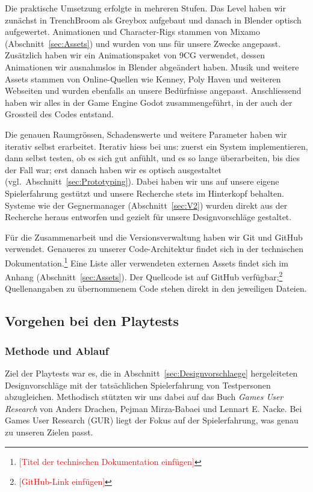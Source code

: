 \documentclass[../Main.tex]{subfiles}
\begin{document}
Die praktische Umsetzung erfolgte in mehreren Stufen. Das Level haben wir zunächst in TrenchBroom als Greybox aufgebaut und danach in Blender optisch aufgewertet. Animationen und Character-Rigs stammen von Mixamo (Abschnitt~\ref{sec:Assets}) und wurden von uns für unsere Zwecke angepasst. Zusätzlich haben wir ein Animationspaket von 9CG verwendet, dessen Animationen wir ausnahmslos in Blender abgeändert haben. Musik und weitere Assets stammen von Online-Quellen wie Kenney, Poly Haven und weiteren Webseiten und wurden ebenfalls an unsere Bedürfnisse angepasst. Anschliessend haben wir alles in der Game Engine Godot zusammengeführt, in der auch der Grossteil des Codes entstand.

Die genauen Raumgrössen, Schadenswerte und weitere Parameter haben wir iterativ selbst erarbeitet. Iterativ hiess bei uns: zuerst ein System implementieren, dann selbst testen, ob es sich gut anfühlt, und es so lange überarbeiten, bis dies der Fall war; erst danach haben wir es optisch ausgestaltet (vgl.\ Abschnitt~\ref{sec:Prototyping}). Dabei haben wir uns auf unsere eigene Spielerfahrung gestützt und unsere Recherche stets im Hinterkopf behalten. Systeme wie der Gegnermanager (Abschnitt~\ref{sec:V2}) wurden direkt aus der Recherche heraus entworfen und gezielt für unsere Designvorschläge gestaltet.

Für die Zusammenarbeit und die Versionsverwaltung haben wir Git und GitHub verwendet. Genaueres zu unserer Code-Architektur findet sich in der technischen Dokumentation.\footnote{\textcolor{red}{[Titel der technischen Dokumentation einfügen]}} Eine Liste aller verwendeten externen Assets findet sich im Anhang (Abschnitt~\ref{sec:Assets}). Der Quellcode ist auf GitHub verfügbar;\footnote{\textcolor{red}{[GitHub-Link einfügen]}} Quellenangaben zu übernommenem Code stehen direkt in den jeweiligen Dateien.

\subsection{Vorgehen bei den Playtests} \label{sec:VorgehenPlaytest}

\subsubsection{Methode und Ablauf} \label{sec:MethodePlaytest}
Ziel der Playtests war es, die in Abschnitt~\ref{sec:Designvorschlaege} hergeleiteten Designvorschläge mit der tatsächlichen Spielerfahrung von Testpersonen abzugleichen. Methodisch stützten wir uns dabei auf das Buch \textit{Games User Research} von Anders Drachen, Pejman Mirza-Babaei und Lennart E. Nacke.\autocite{drachen2018gamesuserresearch} Bei Games User Research (GUR) liegt der Fokus auf der Spielerfahrung,\autocite[2]{drachen2018gamesuserresearch} was genau zu unseren Zielen passt.
\end{document}
